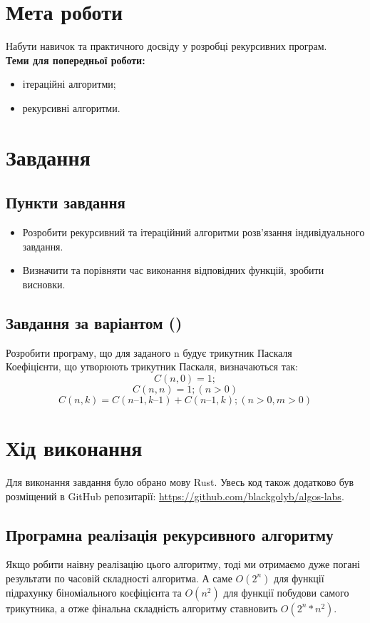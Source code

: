 \section{Мета роботи}
Набути навичок та практичного досвіду у розробці рекурсивних
програм.\\

\noindent
\textbf{Теми для попередньої роботи:}
\begin{itemize}
    \item ітераційні алгоритми;
    \item рекурсивні алгоритми.
\end{itemize}


\section{Завдання}
\subsection{Пункти завдання}
\begin{itemize}
    \item Розробити рекурсивний та ітераційний алгоритми розв’язання
    індивідуального завдання.
    \item Визначити та порівняти час виконання відповідних функцій, зробити
    висновки.
\end{itemize}

\subsection{Завдання за варіантом (\variant)}
Розробити програму, що для заданого n будує трикутник Паскаля\\
Коефіцієнти, що утворюють трикутник Паскаля, визначаються так:\\
$$C(n,0) = 1;$$
$$C(n,n) = 1; (n > 0)$$
$$C(n,k) = C(n – 1,k – 1) + C(n – 1,k); (n > 0, m > 0)$$


\section{Хід виконання}
Для виконання завдання було обрано мову Rust.
Увесь код також додатково був розміщений в GitHub репозитарії: \href{https://github.com/blackgolyb/algos-labs}{https://github.com/blackgolyb/algos-labs}.


\newpage
\subsection{Програмна реалізація рекурсивного алгоритму}
Якщо робити наівну реалізацію цього алгоритму,
тоді ми отримаємо дуже погані результати по часовій складності алгоритма.
А саме $O(2^n)$ для функції підрахунку біноміального коєфіцієнта та $O(n^2)$ для функції побудови самого трикутника,
а отже фінальна складність алгоритму ставновить $O(2^n * n^2)$.

